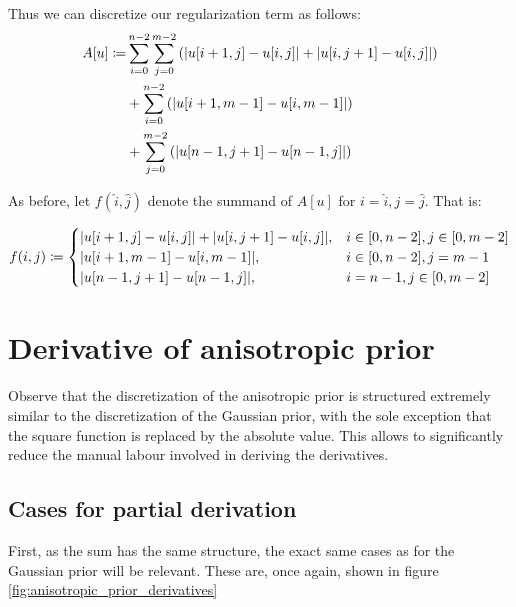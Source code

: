 \documentclass[a4paper]{scrreprt}
\DeclarePairedDelimiter\abs{\lvert}{\rvert}
\begin{document}
Thus we can discretize our regularization term as follows:
\begin{align*}
		A[u] \coloneqq 
		     & \sum_{i=0}^{n-2} \sum_{j=0}^{m-2} \left(\abs{u[i + 1, j] - u[i, j]} + \abs{u[i,j + 1] - u[i, j]}\right) \\
			 & + \sum_{i=0}^{n-2} \left(\abs{u[i + 1, m - 1] - u[i, m - 1]}\right) \\
			 & + \sum_{j=0}^{m-2} \left(\abs{u[n - 1, j + 1] - u[n - 1, j]}\right)
\end{align*}

As before, let $f(\hat{i}, \hat{j})$ denote the summand of $A[u]$ for $i =
\hat{i}, j = \hat{j}$.  That is:

\begin{align*}
		f(i, j) \coloneqq 
		\begin{cases}
				\abs{u[i + 1, j] - u[i, j]} + \abs{u[i, j + 1] - u[i, j]}, & i \in [0, n - 2], j \in [0, m - 2] \\
				\abs{u[i + 1, m - 1] - u[i, m - 1]}, & i \in [0, n - 2], j = m - 1 \\
				\abs{u[n - 1, j + 1] - u[n - 1, j]}, & i = n - 1, j \in [0, m - 2]
		\end{cases}
\end{align*}

\section{Derivative of anisotropic prior}

Observe that the discretization of the anisotropic prior is structured
extremely similar to the discretization of the Gaussian prior, with the sole
exception that the square function is replaced by the absolute value. This
allows to significantly reduce the manual labour involved in deriving the
derivatives.

\subsection{Cases for partial derivation}

First, as the sum has the same structure, the exact same cases as for the
Gaussian prior will be relevant. These are, once again, shown in figure
\ref{fig:anisotropic_prior_derivatives}
\end{document}
